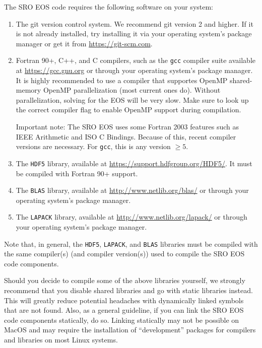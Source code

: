 \documentclass[letterpaper,11pt]{refart}
\begin{document}
The SRO EOS code requires the following software on your system:

\begin{enumerate}
\item The git version control system. We recommend git version 2 and
  higher. If it is not already installed, try installing it via
  your operating system's package manager or get it from
  \url{https://git-scm.com}.
 \item Fortran 90+, C++, and C compilers, such as the \verb|gcc|
   compiler suite available at \url{https://gcc.gnu.org} or through
   your operating system's package manager. It is highly recommended
   to use a compiler that supportes OpenMP shared-memory OpenMP
   parallelization (most current ones do). Without parallelization,
   solving for the EOS will be very slow. Make sure to look up the
   correct compiler flag to enable OpenMP support during compilation.

   Important note: The SRO EOS uses some Fortran 2003 features such as
   IEEE Arithmetic and ISO C Bindings. Because of this, recent compiler versions
   are necessary. For \verb|gcc|, this is any version
   $\ge 5$.
   
 \item The \verb|HDF5| library, available at
   \url{https://support.hdfgroup.org/HDF5/}. It must be compiled with
   Fortran 90+ support.

 \item The \verb|BLAS| library, available at
   \url{http://www.netlib.org/blas/} or through your operating
   system's package manager.

 \item The \verb|LAPACK| library, available at
   \url{http://www.netlib.org/lapack/} or through your operating
   system's package manager.

\end{enumerate}
Note that, in general, the \verb|HDF5|, \verb|LAPACK|, and \verb|BLAS|
libraries must be compiled with the same compiler(s) (and compiler
version(s)) used to compile the SRO EOS code components.

Should you decide to compile some of the above libraries yourself, we
strongly recommend that you disable shared libraries and go with
static libraries instead. This will greatly reduce potential headaches
with dynamically linked symbols that are not found. Also, as a general
guideline, if you can link the SRO EOS code components statically, do
so. Linking statically may not be possible on MacOS and may require
the installation of ``development'' packages for compilers and libraries
on most Linux systems.
\end{document}
